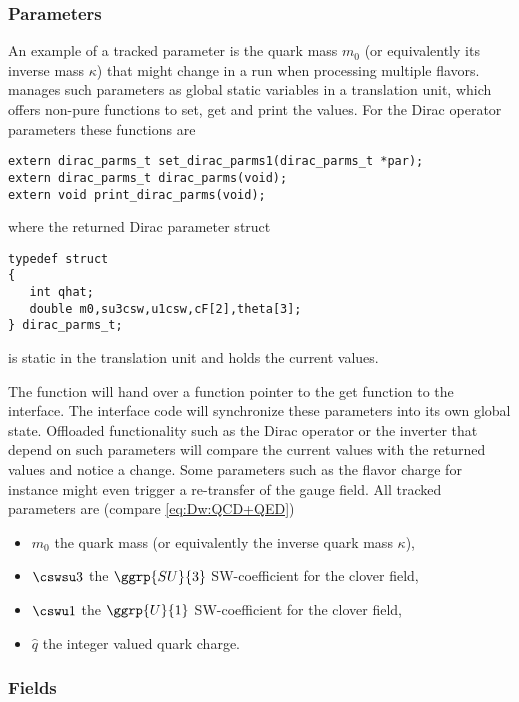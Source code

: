 \subsubsection{Parameters}

An example of a tracked parameter is the quark mass $m_0$ (or equivalently its inverse mass $\kappa$) that might change in a run when processing multiple flavors. \Openqxd manages such parameters as global static variables in a translation unit, which offers non-pure functions to set, get and print the values. For the Dirac operator parameters these functions are
\begin{verbatim}
extern dirac_parms_t set_dirac_parms1(dirac_parms_t *par);
extern dirac_parms_t dirac_parms(void);
extern void print_dirac_parms(void);
\end{verbatim}
where the returned Dirac parameter struct
\begin{verbatim}
typedef struct
{
   int qhat;
   double m0,su3csw,u1csw,cF[2],theta[3];
} dirac_parms_t;
\end{verbatim}
is static in the translation unit and holds the current values.

The  function will hand over a function pointer to the get function  to the interface.
The interface code will synchronize these parameters into its own global state.
Offloaded functionality such as the Dirac operator or the inverter that depend on such parameters will compare the current values with the returned values and notice a change.
Some parameters such as the flavor charge  for instance might even trigger a re-transfer of the gauge field.
All tracked parameters are (compare \cref{eq:Dw:QCD+QED})
\begin{itemize}
  \item $m_0$ the quark mass (or equivalently the inverse quark mass $\kappa$),
  \item $\cswsu3$ the $\ggrp{SU}{3}$ SW-coefficient for the clover field,
  \item $\cswu1$ the $\ggrp{U}{1}$ SW-coefficient for the clover field,
  \item $\hat{q}$ the integer valued quark charge.
\end{itemize}

\subsubsection{Fields}

